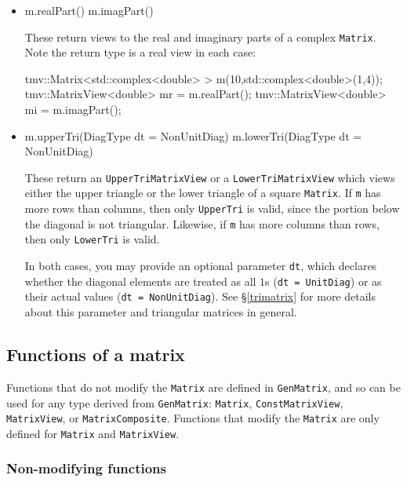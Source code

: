 \documentclass[twoside,letterpaper,11pt]{article}
\renewcommand{\tt}[1]{{\lstinline {#1}}}
\begin{document}
\begin{itemize}
\item
\begin{tmvcode}
m.realPart()
m.imagPart()
\end{tmvcode}
These return views to the real and imaginary parts of a complex \tt{Matrix}.
Note the return type is a real view in each case:
\begin{tmvcode}
tmv::Matrix<std::complex<double> > m(10,std::complex<double>(1,4));
tmv::MatrixView<double> mr = m.realPart();
tmv::MatrixView<double> mi = m.imagPart();
\end{tmvcode}

\item
\begin{tmvcode}
m.upperTri(DiagType dt = NonUnitDiag)
m.lowerTri(DiagType dt = NonUnitDiag)
\end{tmvcode}
These return an \tt{UpperTriMatrixView} or a \tt{LowerTriMatrixView} which
views either the upper triangle or the lower triangle of a square \tt{Matrix}.
If \tt{m} has more rows than columns, then only \tt{UpperTri} is valid, since
the portion below the diagonal is not triangular.
Likewise, if \tt{m} has more columns than rows, then only \tt{LowerTri} is valid.

In both cases, you may provide an optional parameter \tt{dt}, which
declares whether the diagonal elements are treated as all $1$s
(\tt{dt = UnitDiag}) or as their actual values (\tt{dt = NonUnitDiag}). 
See \S\ref{trimatrix} for more details about this parameter and
triangular matrices in general.

\end{itemize}

\subsection{Functions of a matrix}
\label{matrixfunctions}

Functions that do not modify the \tt{Matrix} are defined in 
\tt{GenMatrix}, and so can be used for any type derived from \tt{GenMatrix}:
\tt{Matrix}, \tt{ConstMatrixView}, \tt{MatrixView}, or \tt{MatrixComposite}.
Functions that modify the \tt{Matrix} are only defined for 
\tt{Matrix} and \tt{MatrixView}.

\subsubsection{Non-modifying functions}
\end{document}

